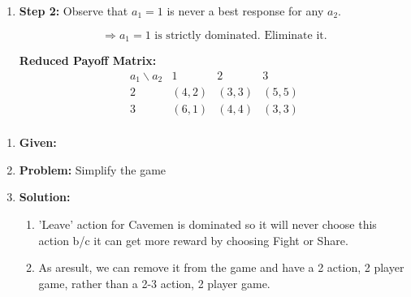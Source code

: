 \begin{example}
\begin{enumerate}
\begin{enumerate}
            \item \textbf{Step 2:} Observe that $a_1 = 1$ is never a best response for any $a_2$.
        
            \[
            \Rightarrow a_1 = 1 \text{ is strictly dominated. Eliminate it.}
            \]
        
            \textbf{Reduced Payoff Matrix:}
            \[
            \begin{array}{c|c|c|c}
            a_1 \backslash a_2 & 1 & 2 & 3 \\
            \hline
            2 & (4,2) & (3,3) & (5,5) \\
            3 & (6,1) & (4,4) & (3,3) \\
            \end{array}
            \]
        \end{enumerate}
    
    \end{enumerate}
\end{example}
\newpage

\begin{example}
    \begin{enumerate}
        \item \textbf{Given:} 
        \item \textbf{Problem:} Simplify the game 
        \item \textbf{Solution:}
        \begin{enumerate}
            \item 'Leave' action for Cavemen is dominated so it will never choose this action b/c it can get more reward by choosing Fight or Share. 
            \item As aresult, we can remove it from the game and have a 2 action, 2 player game, rather than a 2-3 action, 2 player game.
        \end{enumerate}
    \end{enumerate}
\end{example}

